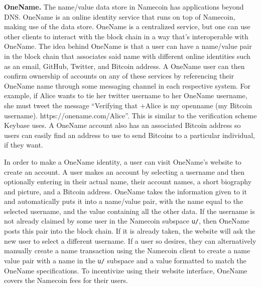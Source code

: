 {\bf OneName.}
The name/value data store in Namecoin has applications beyond DNS. OneName is an online identity service that runs on top of Namecoin, making use of the data store. OneName is a centralized service, but one can use other clients to interact with the block chain in a way that's interoperable with OneName. The idea behind OneName is that a user can have a name/value pair in the block chain that associates said name with different online identities such as an email, GitHub, Twitter, and Bitcoin address. A OneName user can then confirm ownership of accounts on any of these services by referencing their OneName name through some messaging channel in each respective system. For example, if Alice wants to tie her twitter username to her OneName username, she must tweet the message ``Verifying that +Alice is my openname (my Bitcoin username). https://onename.com/Alice''. This is similar to the verification scheme Keybase uses. A OneName account also has an associated Bitcoin address so users can easily find an address to use to send Bitcoins to a particular individual, if they want.

In order to make a OneName identity, a user can visit OneName's website to create an account. A user makes an account by selecting a username and then optionally entering in their actual name, their account names, a short biography and picture, and a Bitcoin address. OneName takes the information given to it and automatically puts it into a name/value pair, with the name equal to the selected username, and the value containing all the other data. If the username is not already claimed by some user in the Namecoin subspace {\tt u/}, then OneName posts this pair into the block chain. If it is already taken, the website will ask the new user to select a different username. If a user so desires, they can alternatively manually create a name transaction using the Namecoin client to create a name value pair with a name in the {\tt u/} subspace and a value formatted to match the OneName specifications. To incentivize using their website interface, OneName covers the Namecoin fees for their users. 

